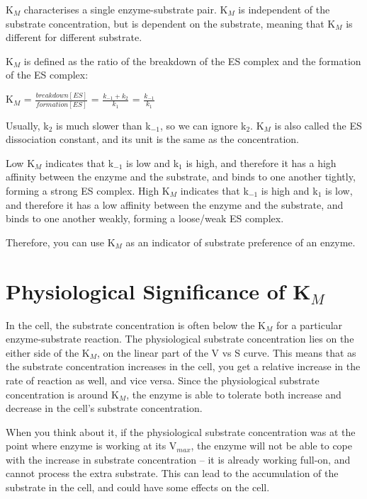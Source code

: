 K$_M$ characterises a single enzyme-substrate pair.
K$_M$ is independent of the substrate concentration, but is dependent on the substrate, meaning that K$_M$ is different for different substrate.

K$_M$ is defined as the ratio of the breakdown of the ES complex and the formation of the ES complex:

\begin{center}
\large{K$_M$ = $\frac{breakdown[ES]}{formation[ES]}$ = $\frac{k_{-1} + k_2}{k_1}$ = $\frac{k_{-1}}{k_1}$}
\end{center}

Usually, k$_2$ is much slower than k$_{-1}$, so we can ignore k$_2$.
K$_M$ is also called the ES dissociation constant, and its unit is the same as the concentration.

Low K$_M$ indicates that k$_{-1}$ is low and k$_1$ is high, and therefore it has a high affinity between the enzyme and the substrate, and binds to one another tightly, forming a strong ES complex.
High K$_M$ indicates that k$_{-1}$ is high and k$_1$ is low, and therefore it has a low affinity between the enzyme and the substrate, and binds to one another weakly, forming a loose/weak ES complex.

Therefore, you can use K$_M$ as an indicator of substrate preference of an enzyme.

\section{Physiological Significance of K$_M$}

In the cell, the substrate concentration is often below the K$_M$ for a particular enzyme-substrate reaction.
The physiological substrate concentration lies on the either side of the K$_M$, on the linear part of the V vs S curve.
This means that as the substrate concentration increases in the cell, you get a relative increase in the rate of reaction as well, and vice versa.
Since the physiological substrate concentration is around K$_M$, the enzyme is able to tolerate both increase and decrease in the cell's substrate concentration.

When you think about it, if the physiological substrate concentration was at the point where enzyme is working at its V$_{max}$, the enzyme will not be able to cope with the increase in substrate concentration -- it is already working full-on, and cannot process the extra substrate.
This can lead to the accumulation of the substrate in the cell, and could have some effects on the cell.

